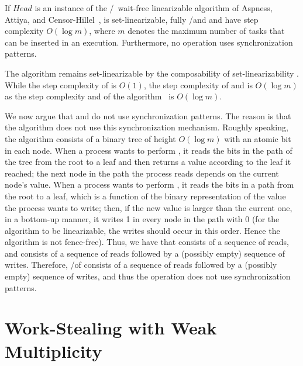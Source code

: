 \begin{theorem}\label{theo-wf-log}
If $Head$ is an instance of the \R/\W\ wait-free linearizable \MaxReg algorithm of Aspness, Attiya, and Censor-Hillel~\cite{DBLP_journals_jacm_AspnesAC12}, \WFWSM is set-linearizable, fully \R/\W and \Take and \Steal have step complexity $O(\log m)$, where $m$ denotes the maximum number of tasks that can be inserted in an execution.  Furthermore, no operation uses \RAW synchronization patterns.
\end{theorem}

\begin{proofT}
The algorithm remains set-linearizable by the composability of set-linearizability \cite{DBLP_journals_jacm_CastanedaRR18}. While the step complexity of \Put is $O(1)$, the step complexity of \Take and \Steal is $O(\log m)$ as the step complexity \MaxR and \MaxW of the \MaxReg algorithm~\cite{DBLP_journals_jacm_AspnesAC12} is $O(\log m)$.

We now argue that \Take and \Steal do not use \RAW synchronization patterns. The reason is that the \MaxReg algorithm does not use this synchronization mechanism. Roughly speaking, the algorithm consists of a binary tree of height $O(\log m)$ with an atomic bit in each node.  When a process wants to perform \MaxR, it reads the bits in the path of the tree from the root to a leaf and then returns a value according to the leaf it reached; the next node in the path the process reads depends on the current node's value. When a process wants to perform \MaxW, it reads the bits in a path from the root to a leaf, which is a function of the binary representation of the value the process wants to write; then, if the new value is larger than the current one, in a bottom-up manner, it writes 1 in every node in the path with 0 (for the algorithm to be linearizable, the writes should occur in this order. Hence the algorithm is not fence-free). Thus, we have that \MaxR consists of a sequence of reads, and \MaxW consists of a sequence of reads followed by a (possibly empty) sequence of writes. Therefore, \Take/\Steal of \WFWSM consists of a sequence of reads followed by a (possibly empty) sequence of writes, and thus the operation does not use \RAW synchronization patterns.
\end{proofT}

\section{\label{sec-ws-nc-mult}Work-Stealing with Weak Multiplicity}


